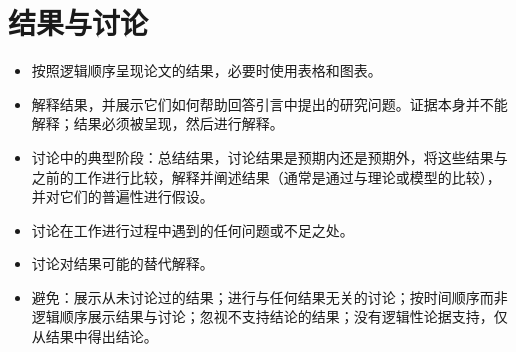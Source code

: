 \section*{结果与讨论}
\begin{itemize}
\item 按照逻辑顺序呈现论文的结果，必要时使用表格和图表。
\item 解释结果，并展示它们如何帮助回答引言中提出的研究问题。证据本身并不能解释；结果必须被呈现，然后进行解释。
\item 讨论中的典型阶段：总结结果，讨论结果是预期内还是预期外，将这些结果与之前的工作进行比较，解释并阐述结果（通常是通过与理论或模型的比较），并对它们的普遍性进行假设。
\item 讨论在工作进行过程中遇到的任何问题或不足之处。
\item 讨论对结果可能的替代解释。
\item 避免：展示从未讨论过的结果；进行与任何结果无关的讨论；按时间顺序而非逻辑顺序展示结果与讨论；忽视不支持结论的结果；没有逻辑性论据支持，仅从结果中得出结论。
\end{itemize}

